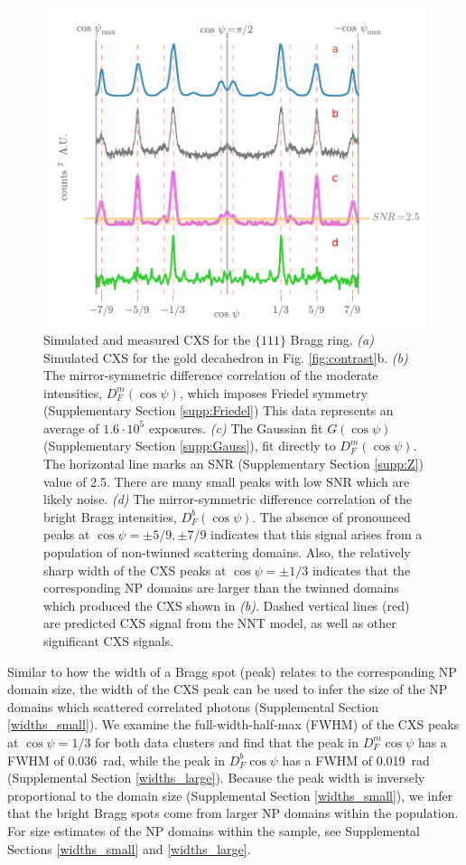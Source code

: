 \documentclass [12pt,fleqn]{article}
\begin{document}
\begin{figure}[H]
\centering
\includegraphics[scale=1]{./Fig4Apr8.pdf}
\caption{Simulated and measured CXS for the $\{111\}$ Bragg ring. \emph{(a)} Simulated CXS for the gold decahedron in Fig. \ref{fig:contrast}b. \emph{(b)} The mirror-symmetric difference correlation of the moderate intensities, $D^m_F(\cos \psi)$, which imposes Friedel symmetry (Supplementary Section \ref{supp:Friedel}) This data represents an average of $1.6\cdot 10^5$ exposures. \emph{(c)} The Gaussian fit $G(\cos \psi)$ (Supplementary Section \ref{supp:Gauss}), fit directly to $D^m_F(\cos \psi)$. The horizontal line marks an SNR (Supplementary Section \ref{supp:Z}) value of 2.5. There are many small peaks with low SNR which are likely noise. \emph{(d)} The mirror-symmetric difference correlation of the bright Bragg intensities, $D^b_F(\cos \psi)$. The absence of pronounced peaks at $\cos \psi = \pm 5/9 , \pm 7/9$ indicates that this signal arises from a population of non-twinned scattering domains. Also, the relatively sharp width of the CXS peaks at $\cos \psi = \pm 1/3$ indicates that the corresponding NP domains are larger than the twinned domains which produced the CXS shown in \emph{(b)}.  Dashed vertical lines (red) are predicted CXS signal from the NNT model, as well as other significant CXS signals. }
\label{fig:Main_result}
\end{figure}

Similar to how the width of a Bragg spot (peak) relates to the corresponding NP domain size, the width of the CXS peak can be used to infer the size of the NP domains which scattered correlated photons (Supplemental Section \ref{widths_small}). We examine the full-width-half-max (FWHM) of the CXS peaks at $\cos \psi = 1/3$ for both data clusters and find that the peak in $D^m_F{\cos \psi}$ has a FWHM of \SI{0.036}{\radian}, while the peak in $D^b_F{\cos \psi}$ has a FWHM of \SI{0.019}{\radian} (Supplemental Section \ref{widths_large}). Because the peak width is inversely proportional to the domain size  (Supplemental Section \ref{widths_small}), we infer that the bright Bragg spots come from larger NP domains within the population. For size estimates of the NP domains within the sample, see Supplemental Sections \ref{widths_small} and \ref{widths_large}.
\end{document}
